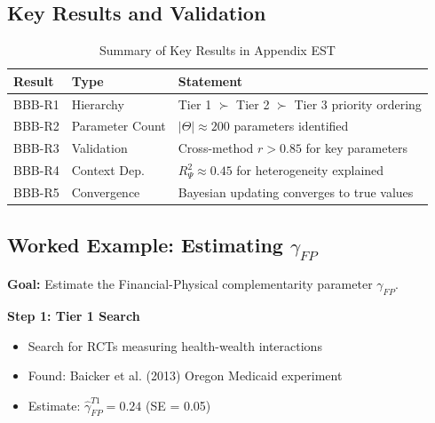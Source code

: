 \subsection{Key Results and Validation}
\label{sec:BBB-results}

\begin{table}[htbp]
\centering
\caption{Summary of Key Results in Appendix EST}
\label{tab:bbb-results}
\renewcommand{\arraystretch}{1.2}
\begin{tabular}{@{}llp{6cm}@{}}
\toprule
\textbf{Result} & \textbf{Type} & \textbf{Statement} \\
\midrule
BBB-R1 & Hierarchy & Tier 1 $\succ$ Tier 2 $\succ$ Tier 3 priority ordering \\
BBB-R2 & Parameter Count & $|\Theta| \approx 200$ parameters identified \\
BBB-R3 & Validation & Cross-method $r > 0.85$ for key parameters \\
BBB-R4 & Context Dep. & $R^2_\Psi \approx 0.45$ for heterogeneity explained \\
BBB-R5 & Convergence & Bayesian updating converges to true values \\
\bottomrule
\end{tabular}
\end{table}


\subsection{Worked Example: Estimating $\gamma_{FP}$}
\label{sec:BBB-example}

\textbf{Goal:} Estimate the Financial-Physical complementarity parameter $\gamma_{FP}$.

\textbf{Step 1: Tier 1 Search}
\begin{itemize}[nosep]
    \item Search for RCTs measuring health-wealth interactions
    \item Found: Baicker et al. (2013) Oregon Medicaid experiment
    \item Estimate: $\hat{\gamma}_{FP}^{T1} = 0.24$ (SE = 0.05)
\end{itemize}

